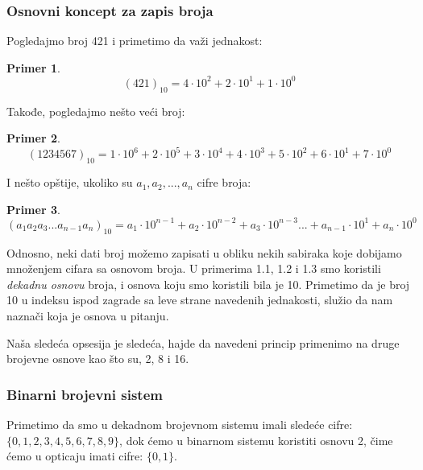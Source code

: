 \documentclass[a4paper]{article}
\newtheorem{primer}{Primer}[section]
\begin{document}
\subsubsection{Osnovni koncept za zapis broja}
Pogledajmo broj 421 i primetimo da važi jednakost:
\begin{primer}
 $$ (421)_{10} = 4\cdot10^2 + 2\cdot10^1 + 1\cdot10^0 $$
\end{primer}

Takođe, pogledajmo nešto veći broj:
\begin{primer}
 $$ (1234567)_{10} = 1\cdot10^6 + 2\cdot10^5 + 3\cdot10^4 + 4\cdot10^3 + 5\cdot10^2 + 6\cdot10^1 + 7\cdot10^0 $$
\end{primer}

I nešto opštije, ukoliko su $a_1, a_2, ..., a_n$ cifre broja:
\begin{primer}
 $$ (a_1a_2a_3...a_{n-1}a_n)_{10} = a_1\cdot10^{n-1}+a_2\cdot10^{n-2}+a_3\cdot10^{n-3}...+a_{n-1}\cdot10^1+a_n\cdot10^0$$
\end{primer}

Odnosno, neki dati broj možemo zapisati u obliku nekih sabiraka koje dobijamo množenjem cifara sa osnovom broja.
U primerima  1.1, 1.2 i 1.3 smo koristili \emph{dekadnu osnovu} broja, i osnova koju smo koristili bila je 10. Primetimo
da je broj 10 u indeksu ispod zagrade sa leve strane navedenih jednakosti, služio da nam naznači koja je osnova u pitanju.

Naša sledeća opsesija je sledeća, hajde da navedeni princip primenimo na druge brojevne osnove kao što su, 2, 8 i 16.

\subsubsection{Binarni brojevni sistem}
Primetimo da smo u dekadnom brojevnom sistemu imali sledeće cifre: $ \{0, 1, 2, 3, 4, 5, 6, 7, 8, 9\} $, dok ćemo u binarnom
sistemu koristiti osnovu 2, čime ćemo u opticaju imati cifre: $ \{0, 1\} $. 
\end{document}
